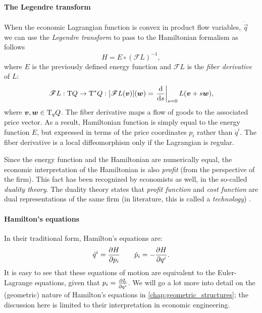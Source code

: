 \paragraph{The Legendre transform} 
When the economic Lagrangian function is convex in product flow variables, $\dot{\vec{q}}$ we can use the \emph{Legendre transform} to pass to the Hamiltonian formalism as follows \cite{Abraham1978}
\begin{equation}
    H = E \circ (\mathscr{F}L)^{-1},
\end{equation}
where $E$ is the previously defined energy function and $\mathscr{F}L$ is the \emph{fiber derivative} of $L$: \cite{Marsden1998}
\begin{equation}
    \mathscr{F}L: \tbundle{Q} \to \ctbundle{Q}: [\mathscr{F}L(\vec{v})](\vec{w}) = \left .\dv{}{s}\right|_{s = 0} L(\vec{v} + s\vec{w}),
\end{equation}
where $\vec{v}, \vec{w} \in \tspace{q}{Q}$. The fiber derivative maps a flow of goods to the associated price vector. As a result, Hamiltonian function is simply equal to the energy function $E$, but expressed in terms of the price coordinates $p_i$ rather than $\dot{q}^i$. The fiber derivative is a local diffeomorphism only if the Lagrangian is regular.

Since the energy function and the Hamiltonian are numerically equal, the economic interpretation of the Hamiltonian is also \emph{profit} (from the perspective of the firm). This fact has been recognized by economists as well, in the so-called \emph{duality theory}. The duality theory states that \emph{profit function} and \emph{cost function} are dual representations of the same firm (in literature, this is called a \emph{technology}) \cite{blume2020,varianhalr1992}.

\paragraph{Hamilton's equations} In their traditional form, Hamilton's equations are:
\begin{equation}
    \dot{q}^i = \pdv{H}{p_i} \qquad \dot{p}_i = -\pdv{H}{q^i}.
\end{equation}
It is easy to see that these equations of motion are equivalent to the Euler-Lagrange equations, given that $p_i = \pdv{L}{\dot{q^i}}$. We will go a lot more into detail on the (geometric) nature of Hamilton's equations in \cref{chap:geometric_structures}; the discussion here is limited to their interpretation in economic engineering.

